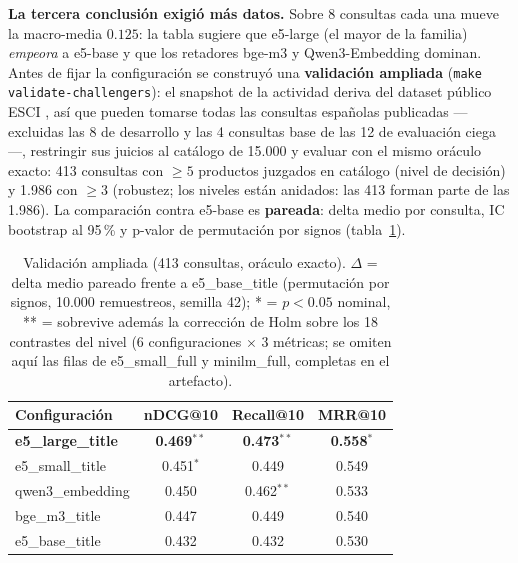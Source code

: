 \documentclass[10pt,twocolumn]{article}
\newcommand{\code}[1]{\texttt{\small #1}}
\begin{document}
\textbf{La tercera conclusión exigió más datos.} Sobre 8 consultas cada una
mueve la macro-media $0.125$: la tabla sugiere que e5-large (el mayor de la
familia) \emph{empeora} a e5-base y que los retadores bge-m3 y
Qwen3-Embedding dominan. Antes de fijar la configuración se construyó una
\textbf{validación ampliada} (\code{make validate-challengers}): el snapshot
de la actividad deriva del dataset público ESCI \cite{reddy2022}, así que
pueden tomarse todas las consultas españolas publicadas ---excluidas las 8
de desarrollo y las 4 consultas base de las 12 de evaluación ciega---,
restringir sus juicios al catálogo de 15.000 y evaluar con el mismo oráculo
exacto: 413 consultas con $\geq 5$ productos juzgados en catálogo (nivel de
decisión) y 1.986 con $\geq 3$ (robustez; los niveles están anidados: las
413 forman parte de las 1.986). La comparación contra e5-base es
\textbf{pareada}: delta medio por consulta, IC bootstrap al 95\,\% y p-valor
de permutación por signos (tabla~\ref{tab:validacion}).

\begin{table}[h]
  \centering\small
  \caption{Validación ampliada (413 consultas, oráculo exacto). $\Delta$ =
  delta medio pareado frente a e5\_base\_title (permutación por signos,
  10.000 remuestreos, semilla 42); * = $p<0.05$ nominal, ** = sobrevive
  además la corrección de Holm sobre los 18 contrastes del nivel (6
  configuraciones $\times$ 3 métricas; se omiten aquí las filas de
  e5\_small\_full y minilm\_full, completas en el artefacto).}
  \label{tab:validacion}
  \begin{tabular}{@{}lccc@{}}
    \toprule
    Configuración & nDCG@10 & Recall@10 & MRR@10 \\
    \midrule
    \textbf{e5\_large\_title} & \textbf{0.469}$^{**}$ & \textbf{0.473}$^{**}$ & \textbf{0.558}$^{*}$ \\
    e5\_small\_title & 0.451$^{*}$ & 0.449 & 0.549 \\
    qwen3\_embedding & 0.450 & 0.462$^{**}$ & 0.533 \\
    bge\_m3\_title & 0.447 & 0.449 & 0.540 \\
    e5\_base\_title & 0.432 & 0.432 & 0.530 \\
    \bottomrule
  \end{tabular}
\end{table}
\end{document}
